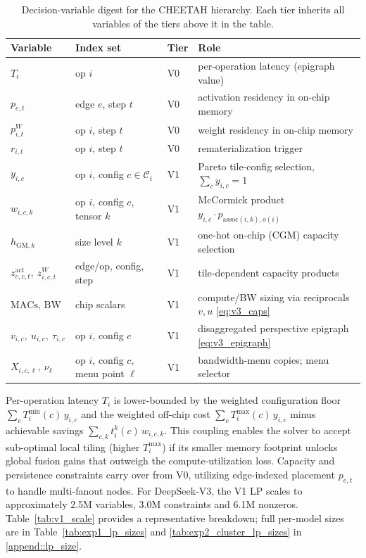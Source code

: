 \begin{table}[h!]
\centering
\caption{Decision-variable digest for the CHEETAH hierarchy. Each tier inherits all variables of the tiers above it in the table.}
\label{tab:var_digest}
\small
\begin{tabular}{llll}
\toprule
Variable & Index set & Tier & Role \\
\midrule
$T_i$ & op $i$ & V0 & per-operation latency (epigraph value) \\
$p_{e,t}$ & edge $e$, step $t$ & V0 & activation residency in on-chip memory \\
$p^{W}_{i,t}$ & op $i$, step $t$ & V0 & weight residency in on-chip memory \\
$r_{i,t}$ & op $i$, step $t$ & V0 & rematerialization trigger \\
\midrule
$y_{i,c}$ & op $i$, config $c\in\mathcal{C}_i$ & V1 & Pareto tile-config selection, $\sum_c y_{i,c}=1$ \\
$w_{i,c,k}$ & op $i$, config $c$, tensor $k$ & V1 & McCormick product $y_{i,c}\cdot p_{\mathrm{assoc}(i,k),o(i)}$ \\
\midrule
$h_{\mathrm{GM},k}$ & size level $k$ & V1 & one-hot on-chip (CGM) capacity selection \\
$z^{\mathrm{act}}_{e,c,t},\ z^{W}_{i,c,t}$ & edge/op, config, step & V1 & tile-dependent capacity products \\
\midrule
$\mathrm{MACs},\,\mathrm{BW}$ & chip scalars & V1 & compute/BW sizing via reciprocals $v,u$ \eqref{eq:v3_caps} \\
$v_{i,c},\ u_{i,c},\ \tau_{i,c}$ & op $i$, config $c$ & V1 & disaggregated perspective epigraph \eqref{eq:v3_epigraph} \\
$X_{i,c,\ell},\ \nu_\ell$ & op $i$, config $c$, menu point $\ell$ & V1 & bandwidth-menu copies; menu selector \\
\bottomrule
\end{tabular}
\end{table}

Per-operation latency $T_i$ is lower-bounded by the weighted
configuration floor $\sum_c T_i^{\min}(c)\, y_{i,c}$ and the weighted
off-chip cost $\sum_c T_i^{\max}(c)\, y_{i,c}$ minus achievable savings
$\sum_{c,k} t_i^k(c)\, w_{i,c,k}$.
This coupling enables the solver to accept sub-optimal local tiling
(higher $T_i^{\max}$) if its smaller memory footprint unlocks global
fusion gains that outweigh the compute-utilization loss.
Capacity and persistence constraints carry over from V0, utilizing
edge-indexed placement $p_{e,t}$ to handle multi-fanout nodes.
For DeepSeek-V3, the V1 LP scales to approximately 2.5M variables,
3.0M constraints and 6.1M nonzeros. Table~\ref{tab:v1_scale} provides a representative breakdown; full per-model sizes are in Table~\ref{tab:exp1_lp_sizes} and \ref{tab:exp2_cluster_lp_sizes} in \cref{append::lp_size}. 




